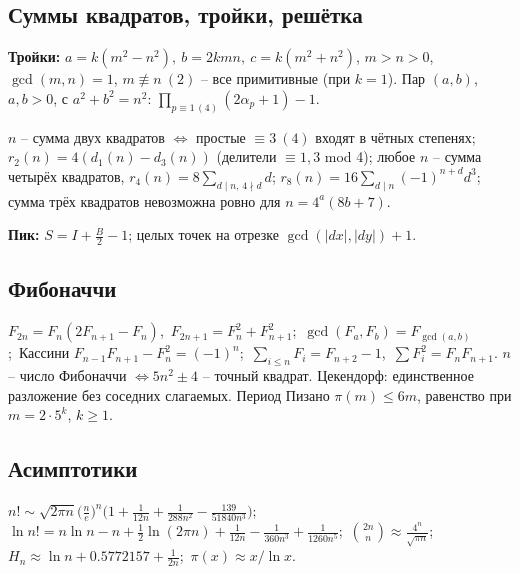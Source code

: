\subsection{Суммы квадратов, тройки, решётка}
\textbf{Тройки:} $a=k(m^2{-}n^2),\ b=2kmn,\ c=k(m^2{+}n^2)$, $m>n>0$, $\gcd(m,n)=1$, $m\not\equiv n\ (2)$ -- все примитивные (при $k{=}1$). Пар $(a,b)$, $a,b>0$, с $a^2{+}b^2=n^2$: $\prod_{p\equiv1\,(4)}(2\alpha_p{+}1)-1$.
\par $n$ -- сумма двух квадратов $\iff$ простые $\equiv3\ (4)$ входят в чётных степенях; $r_2(n)=4(d_1(n){-}d_3(n))$ (делители $\equiv1,3$ mod 4); любое $n$ -- сумма четырёх квадратов, $r_4(n)=8\sum_{d\mid n,\,4\nmid d}d$; $r_8(n)=16\sum_{d\mid n}(-1)^{n+d}d^3$; сумма трёх квадратов невозможна ровно для $n=4^a(8b{+}7)$.
\par \textbf{Пик:} $S=I+\frac B2-1$; целых точек на отрезке $\gcd(|dx|,|dy|){+}1$.
\subsection{Фибоначчи}
$F_{2n}=F_n(2F_{n+1}{-}F_n)$,\ $F_{2n+1}=F_n^2+F_{n+1}^2$;\ $\gcd(F_a,F_b)=F_{\gcd(a,b)}$;\ Кассини $F_{n-1}F_{n+1}-F_n^2=(-1)^n$;\ $\sum_{i\le n}F_i=F_{n+2}-1$,\ $\sum F_i^2=F_nF_{n+1}$. $n$ -- число Фибоначчи $\iff5n^2\pm4$ -- точный квадрат. Цекендорф: единственное разложение без соседних слагаемых. Период Пизано $\pi(m)\le6m$, равенство при $m=2\cdot5^k$, $k\ge1$.
\subsection{Асимптотики}
$n!\sim\sqrt{2\pi n}\big(\frac ne\big)^n\big(1+\frac1{12n}+\frac1{288n^2}-\frac{139}{51840n^3}\big)$;\ $\ln n!=n\ln n-n+\frac12\ln(2\pi n)+\frac1{12n}-\frac1{360n^3}+\frac1{1260n^5}$;\ $\binom{2n}n\approx\frac{4^n}{\sqrt{\pi n}}$;\ $H_n\approx\ln n+0.5772157+\frac1{2n}$;\ $\pi(x)\approx x/\ln x$.
